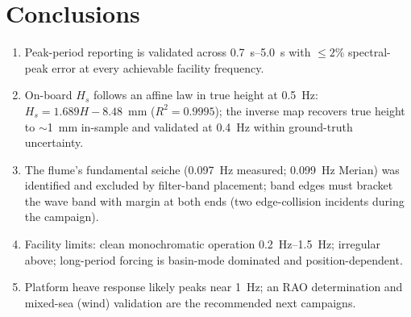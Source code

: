 \documentclass[11pt,a4paper]{article}
\begin{document}
\section{Conclusions}
\begin{enumerate}
  \item Peak-period reporting is validated across \SIrange{0.7}{5.0}{\second}
        with $\le 2\%$ spectral-peak error at every achievable facility
        frequency.
  \item On-board $H_s$ follows an affine law in true height at
        \SI{0.5}{\hertz}: $H_s = 1.689H - 8.48$~mm
        ($R^2 = 0.9995$); the inverse map recovers true height to
        $\sim$\SI{1}{\milli\meter} in-sample and validated at
        \SI{0.4}{\hertz} within ground-truth uncertainty.
  \item The flume's fundamental seiche (\SI{0.097}{\hertz} measured;
        \SI{0.099}{\hertz} Merian) was identified and excluded by filter-band
        placement; band edges must bracket the wave band with margin at both
        ends (two edge-collision incidents during the campaign).
  \item Facility limits: clean monochromatic operation
        \SIrange{0.2}{1.5}{\hertz}; irregular above; long-period forcing is
        basin-mode dominated and position-dependent.
  \item Platform heave response likely peaks near \SI{1}{\hertz}; an RAO
        determination and mixed-sea (wind) validation are the recommended
        next campaigns.
\end{enumerate}
\end{document}
